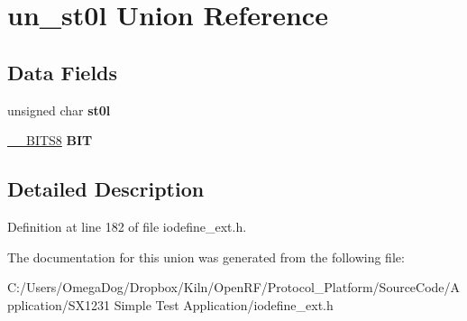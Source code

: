 \hypertarget{unionun__st0l}{\section{un\-\_\-st0l Union Reference}
\label{unionun__st0l}
}
\subsection*{Data Fields}
\begin{DoxyCompactItemize}
\item 
\hypertarget{unionun__st0l_a76c66e7623e4a9149fb11183b9162e6f}{unsigned char {\bfseries st0l}}\label{unionun__st0l_a76c66e7623e4a9149fb11183b9162e6f}

\item 
\hypertarget{unionun__st0l_a6524192623cb04779dfc9059bdf72865}{\hyperlink{struct_____b_i_t_s8}{\-\_\-\-\_\-\-B\-I\-T\-S8} {\bfseries B\-I\-T}}\label{unionun__st0l_a6524192623cb04779dfc9059bdf72865}

\end{DoxyCompactItemize}


\subsection{Detailed Description}


Definition at line 182 of file iodefine\-\_\-ext.\-h.



The documentation for this union was generated from the following file\-:\begin{DoxyCompactItemize}
\item 
C\-:/\-Users/\-Omega\-Dog/\-Dropbox/\-Kiln/\-Open\-R\-F/\-Protocol\-\_\-\-Platform/\-Source\-Code/\-Application/\-S\-X1231 Simple Test Application/iodefine\-\_\-ext.\-h\end{DoxyCompactItemize}
